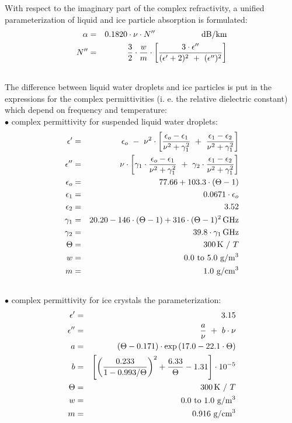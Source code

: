 With respect to the imaginary part of the complex refractivity, a 
unified parameterization of liquid and ice particle absorption 
is formulated:
\begin{eqnarray}
  \alpha & = & 0.1820 \cdot \nu \cdot\imn\hspace*{20mm}
               \mbox{dB/km}\\
    \imn & = & \frac{3}{2} \cdot \frac{w}{m} \cdot 
               \left[\frac{3\cdot
                   \ime}{(\ree+2)^2~+~(\ime)^2}\right]\nonumber\\
  \nonumber
\end{eqnarray}
%
The difference between liquid water droplets and ice particles is
put in the expressions for the complex permittivities
(i. e. the relative dielectric constant) which depend on frequency and
temperature:\\
$\bullet$ complex permittivity for suspended liquid water droplets:
\begin{eqnarray}
  \ree       & = & \epsilon_o~-~\nu^2\cdot
                   \left[\frac{\epsilon_o-\epsilon_1}{\nu^2+\gamma_1^2}~+~
                   \frac{\epsilon_1-\epsilon_2}{\nu^2+\gamma_1^2}\right]\nonumber\\
%
  \ime       & = & \nu\cdot\left[\gamma_1\cdot
                   \frac{\epsilon_o-\epsilon_1}{\nu^2+\gamma_1^2}~+~
                   \gamma_2\cdot\frac{\epsilon_1-\epsilon_2}{\nu^2+\gamma_1^2}\right]\nonumber\\
%
  \epsilon_o & = & 77.66 + 103.3\cdot(\Theta-1)\nonumber\\
  \epsilon_1 & = & 0.0671\cdot\epsilon_o\nonumber\\
  \epsilon_2 & = & 3.52\nonumber\\
%
  \gamma_1   & = & 20.20 - 146\cdot(\Theta-1) + 316\cdot(\Theta-1)^2\,\mbox{GHz}\nonumber\\
  \gamma_2   & = & 39.8\cdot\gamma_1\,\mbox{GHz}\nonumber\\
%
  \Theta     & = & 300\,\mbox{K}~/~T\nonumber\\
%
  w          & = & 0.0~\mbox{to}~5.0~\mbox{g}/\mbox{m}^3 \nonumber\\
  m          & = & 1.0~\mbox{g}/\mbox{cm}^3\nonumber\\
  \nonumber
\end{eqnarray}
$\bullet$ complex permittivity for ice crystals the parameterization:
\begin{eqnarray}
  \ree    & = & 3.15\nonumber\\
%
  \ime    & = & \frac{a}{\nu}~+~b\cdot\nu\nonumber\\
%
  a       & = & (\Theta-0.171)\cdot\exp{(17.0-22.1\cdot\Theta)}\nonumber\\
  b       & = & \left[\left(\frac{0.233}{1-0.993/\Theta}\right)^2 + 
                \frac{6.33}{\Theta} - 1.31\right]\cdot10^{-5}\nonumber\\
%
  \Theta  & = & 300\,\mbox{K}~/~T\nonumber\\
%
  w       & = & 0.0~\mbox{to}~1.0~\mbox{g}/\mbox{m}^3 \nonumber\\
  m       & = & 0.916~\mbox{g}/\mbox{cm}^3\nonumber\\
  \nonumber
\end{eqnarray}
